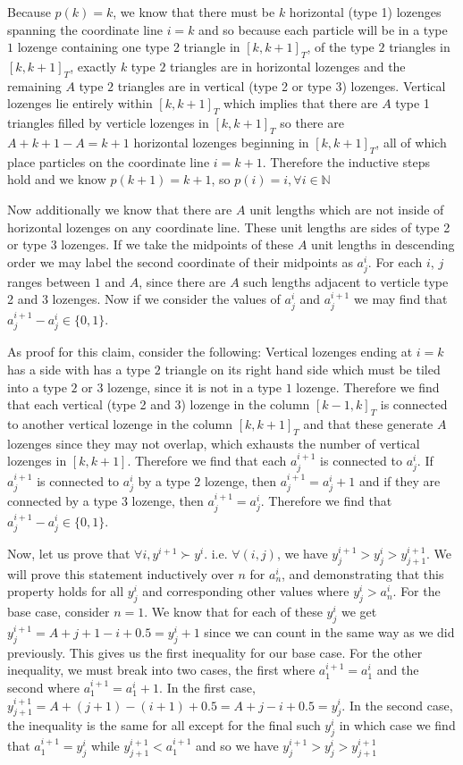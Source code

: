 \documentclass[12pt]{article}
\begin{document}
	Because $p(k)=k$,  we know that there must be $k$ horizontal (type 1) lozenges spanning the coordinate line $i=k$ and so because each particle will be in a type $1$ lozenge containing one type 2 triangle in $[k,k+1]_T$, of the type $2$ triangles in $[k,k+1]_T$, exactly $k$ type $2$ triangles are in horizontal lozenges and the remaining $A$ type $2$ triangles are in vertical (type 2 or type 3) lozenges. 
		 Vertical lozenges lie entirely within $[k,k+1]_T$ which implies that there are $A$ type 1 triangles filled by verticle lozenges in $[k,k+1]_T$ so there are $A+k+1-A=k+1$ horizontal lozenges beginning in $[k,k+1]_T$, all of which place particles on the coordinate line $i=k+1$. Therefore the inductive steps hold and we know $p(k+1)=k+1$, so $p(i)=i, \forall i\in \mathbb{N}$
		
		Now additionally we know that there are $A$ unit lengths which are not inside of horizontal lozenges on any coordinate line. These unit lengths are sides of type 2 or type 3 lozenges. If we take the midpoints of these $A$ unit lengths in descending order we may label the second coordinate of their midpoints as $a_j^i$. For each $i$, $j$ ranges between $1$ and $A$, since there are $A$ such lengths adjacent to verticle type 2 and 3 lozenges. Now if we consider the values of $a_j^i$ and $a_j^{i+1}$ we may find that $a_j^{i+1}-a_j^i\in \{0,1\}$. 
		
		As proof for this claim, consider the following: Vertical lozenges ending at $i=k$ has a side with has a type $2$ triangle on its right hand side which must be tiled into a type $2$ or $3$ lozenge, since it is not in a type $1$ lozenge. Therefore we find that each vertical (type 2 and 3) lozenge in the column $[k-1,k]_T$ is connected  to another vertical lozenge in the column $[k,k+1]_T$ and that these generate $A$ lozenges since they may not overlap, which exhausts the number of vertical lozenges in $[k,k+1]$. Therefore we find that each $a_j^{i+1}$ is connected to $a_j^{i}$. If $a_{j}^{i+1}$ is connected to $a_j^i$ by a type $2$ lozenge, then $a_{j}^{i+1}=a_j^i+1$ and if they are connected by a type 3 lozenge, then $a_j^{i+1}=a_j^i$. Therefore we find that $a_j^{i+1}-a_j^i\in \{0,1\}$.
	
		Now, let us prove that $\forall i, y^{i+1}\succ y^i$. i.e. $\forall (i,j)$, we have $y_j^{i+1}>y_j^{i}>y_{j+1}^{i+1}$. We will prove this statement inductively over $n$ for $a_{n}^i$, and demonstrating that this property holds for all $y_j^i$ and corresponding other values where $y_j^i>a_n^i$. For the base case, consider $n=1$. We know that for each of these $y_j^i$ we get $y_j^{i+1}=A+j+1-i+0.5=y_j^i+1$ since we can count in the same way as we did previously. This gives us the first inequality for our base case. For the other inequality, we must break into two cases, the first where $a_1^{i+1}=a_1^i$ and the second where $a_1^{i+1}=a_1^i+1$. In the first case, $y_{j+1}^{i+1}=A+(j+1)-(i+1)+0.5=A+j-i+0.5=y_j^i$. In the second case, the inequality is the same for all except for the final such $y_j^i$ in which case we find that $a_1^{i+1}=y_j^i$ while $y_{j+1}^{i+1}<a_1^{i+1}$ and so we have $y_j^{i+1}>y_j^i>y_{j+1}^{i+1}$
		
\end{document}

